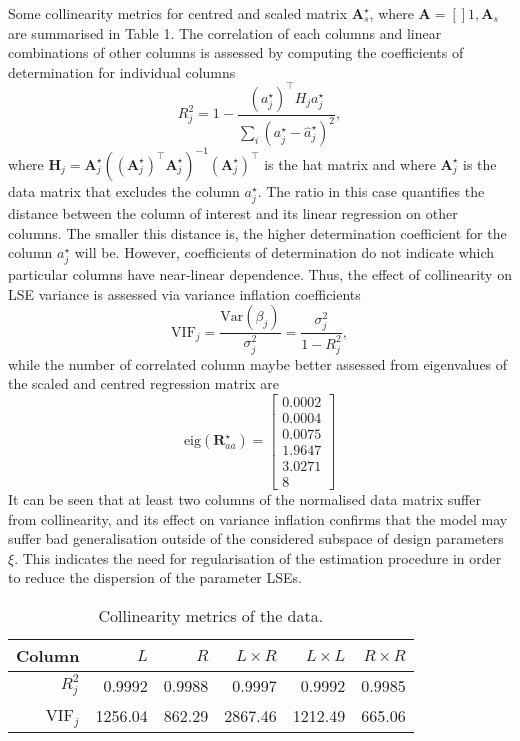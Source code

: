 \documentclass[a4paper,11pt,twoside]{article}
\theoremstyle{mytheoremstyle}
\begin{document}
Some collinearity metrics for centred and scaled matrix $\mathbf{A}_{s}^{\star}$, where $\mathbf{A} = \left[\right]1, \mathbf{A}_{s}$ are summarised in Table 1. The correlation of each columns and linear combinations of other columns is assessed by computing the coefficients of determination for individual columns
\begin{equation*}
R^{2}_{j} = 1 - \frac{(a^{\star}_{j})^{\top} H_j a^{\star}_{j}}{\sum_{i}( a^{\star}_{j} - \hat{a}^{\star}_{j})^2},
\end{equation*} 
where $ \mathbf{H}_j = \mathbf{A}_{j}^{\star}((\mathbf{A}_{j}^{\star})^{\top}\mathbf{A}_{j}^{\star})^{-1}(\mathbf{A}_{j}^{\star})^{\top}$ is the hat matrix and where $\mathbf{A}_{j}^{\star}$ is the data matrix that excludes the column $a^{\star}_{j}$. The ratio in this case quantifies the distance between the column of interest and its linear  regression on other columns. The smaller this distance is, the higher determination coefficient for the column $a^{\star}_{j}$ will be. However, coefficients of determination do not indicate which particular columns have near-linear dependence. Thus, the effect of collinearity on LSE variance is assessed via variance inflation coefficients
\begin{equation*}
\text{VIF}_j = \frac{\text{Var}(\beta_j)}{\sigma^{2}_{j}} = \frac{\sigma^{2}_{j}}{1 - R^{2}_{j}},
\end{equation*}
while the number of correlated column maybe better assessed from eigenvalues of the scaled and centred regression matrix are
\begin{equation*}
\text{eig}(\mathbf{R}^{\star}_{aa}) = \left[\begin{array}{r}
0.0002\\
0.0004\\
0.0075\\
1.9647\\
3.0271\\
8
\end{array}\right]
\end{equation*}
It can be seen that at least two columns of the normalised data matrix suffer from collinearity, and its effect on variance inflation confirms that the model may suffer bad generalisation outside of the considered subspace of design parameters $\xi$. This indicates the need for regularisation of the estimation procedure in order to reduce the dispersion of the parameter LSEs.
\begin{table}[!h]
	\centering
	\caption{Collinearity metrics of the data.}\label{tab:vifs}
	\begin{tabular}{rrrrrr}
		Column & $L$ & $R$ & $L \times R$ & $L \times L$ & $R \times R$ \\
		\hline
		$R^{2}_{j}$ & 0.9992  &  0.9988  &  0.9997  &  0.9992  &  0.9985 \\
		VIF$_j$ & 1256.04 & 862.29 & 2867.46 & 1212.49 & 665.06 \\
		\hline
	\end{tabular}
\end{table}
\end{document}
